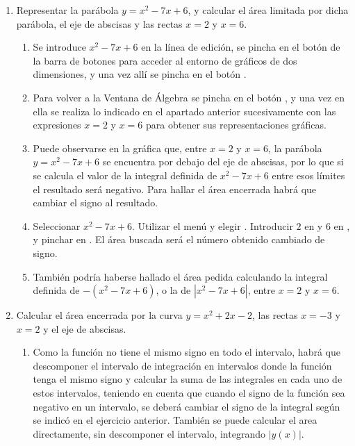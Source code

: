 \begin{enumerate}[leftmargin=*]
\item Representar la parábola $y=x^{2}-7x+6$, y calcular el área
limitada por dicha parábola, el eje de abscisas y las rectas $x=2$ y $x=6$.

\begin{indication}
{
\begin{enumerate}
\item Se introduce $x^{2}-7x+6$ en la línea de edición, se pincha en el botón  de la barra de botones para acceder al entorno de
gráficos de dos dimensiones, y una vez allí se pincha en el botón
.

\item Para volver a la Ventana de Álgebra se pincha en el botón
, y una vez en ella se realiza
lo indicado en el apartado anterior sucesivamente con las
expresiones $x=2$ y $x=6$ para obtener sus representaciones
gráficas.

\item Puede observarse en la gráfica que, entre $x=2$ y $x=6$,
la parábola $y=x^{2}-7x+6$ se encuentra por debajo del eje de
abscisas, por lo que si se calcula el valor de la integral definida
de $x^{2}-7x+6$ entre esos límites el resultado será negativo. Para
hallar el área encerrada habrá que cambiar el signo al resultado.

\item Seleccionar $x^{2}-7x+6$. Utilizar el menú  y elegir
. Introducir $2$ en  y $6$ en , y pinchar en
. El área buscada será el número obtenido
cambiado de signo.

\item También podría haberse hallado el área pedida calculando la integral definida de $-(x^{2}-7x+6)$, o la de
$|x^{2}-7x+6|$, entre $x=2$ y $x=6$.
\end{enumerate}
}
\end{indication}

\item Calcular el área encerrada por la curva $y=x^{2}+2x-2$, las rectas $x=-3$ y $x=2$ y el eje de abscisas.
\begin{indication}
{
\begin{enumerate}
\item Como la función no tiene el mismo signo en todo el intervalo, habrá que descomponer
 el intervalo de integración en intervalos donde la función tenga el mismo
 signo y calcular la suma de las integrales en cada uno de estos intervalos, teniendo en
cuenta que cuando el signo de la función
 sea negativo en un intervalo, se deberá cambiar el signo de la integral
 según se indicó en el ejercicio anterior. También se puede calcular el area
 directamente, sin descomponer el intervalo, integrando $|y(x)|$.


\end{enumerate}}
\end{indication}
\end{enumerate}
